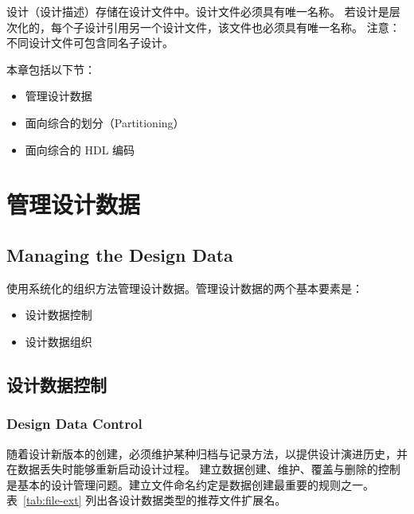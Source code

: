 \label{app:filemgmt}

设计（设计描述）存储在设计文件中。设计文件必须具有唯一名称。
若设计是层次化的，每个子设计引用另一个设计文件，该文件也必须具有唯一名称。
注意：不同设计文件可包含同名子设计。

本章包括以下节：
\begin{itemize}
  \item 管理设计数据
  \item 面向综合的划分（Partitioning）
  \item 面向综合的 HDL 编码
\end{itemize}

\section{管理设计数据}
\subsection*{Managing the Design Data}

使用系统化的组织方法管理设计数据。管理设计数据的两个基本要素是：
\begin{itemize}
  \item 设计数据控制
  \item 设计数据组织
\end{itemize}

\subsection{设计数据控制}
\subsubsection*{Design Data Control}

随着设计新版本的创建，必须维护某种归档与记录方法，以提供设计演进历史，并在数据丢失时能够重新启动设计过程。
建立数据创建、维护、覆盖与删除的控制是基本的设计管理问题。建立文件命名约定是数据创建最重要的规则之一。
表~\ref{tab:file-ext} 列出各设计数据类型的推荐文件扩展名。

